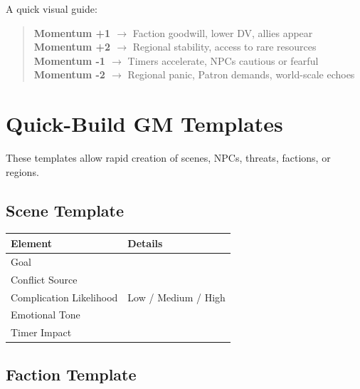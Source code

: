 \documentclass[11pt]{article}
\begin{document}
A quick visual guide:

\begin{quote}
\textbf{Momentum +1 $\rightarrow$} Faction goodwill, lower DV, allies appear \\
\textbf{Momentum +2 $\rightarrow$} Regional stability, access to rare resources \\
\textbf{Momentum -1 $\rightarrow$} Timers accelerate, NPCs cautious or fearful \\
\textbf{Momentum -2 $\rightarrow$} Regional panic, Patron demands, world-scale echoes
\end{quote}


\section{Quick-Build GM Templates}
\label{appendix:quick-build}

These templates allow rapid creation of scenes, NPCs, threats, factions, or regions.

\subsection{Scene Template}

\begin{center}
\begin{longtable}{|p{4cm}|p{10cm}|}
\hline
\textbf{Element} & \textbf{Details} \\
\hline
Goal & \underline{\phantom{XXXXXXXXXXXXXXXXXXX}} \\
Conflict Source & \underline{\phantom{XXXXXXXXXXXX}} \\
Complication Likelihood & Low / Medium / High \\
Emotional Tone & \underline{\phantom{XXXXXXXX}} \\
Timer Impact & \underline{\phantom{XXXXXXXX}} \\
\hline
\end{longtable}
\end{center}

\subsection{Faction Template}
\end{document}
